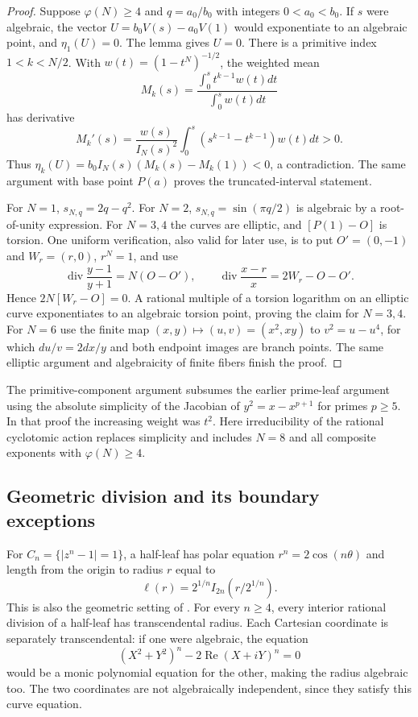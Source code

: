 \documentclass[11pt,a4paper]{article}
\theoremstyle{definition}
\theoremstyle{remark}
\numberwithin{equation}{section}
\begin{document}
\begin{proof}
Suppose $\varphi(N)\ge4$ and $q=a_0/b_0$ with integers
$0<a_0<b_0$.  If $s$ were algebraic, the vector
$U=b_0V(s)-a_0V(1)$ would exponentiate to an algebraic point, and
$\eta_1(U)=0$.  The lemma gives $U=0$.
There is a primitive index $1<k<N/2$.  With
$w(t)=(1-t^N)^{-1/2}$, the weighted mean
\[
M_k(s)=\frac{\int_0^s t^{k-1}w(t)dt}{\int_0^s w(t)dt}
\]
has derivative
\[
M_k'(s)=\frac{w(s)}{I_N(s)^2}
\int_0^s(s^{k-1}-t^{k-1})w(t)dt>0.
\]
Thus $\eta_k(U)=b_0I_N(s)(M_k(s)-M_k(1))<0$, a contradiction.
The same argument with base point $P(a)$ proves the truncated-interval
statement.

For $N=1$, $s_{N,q}=2q-q^2$.  For $N=2$,
$s_{N,q}=\sin(\pi q/2)$ is algebraic by a root-of-unity expression.
For $N=3,4$ the curves are elliptic, and $[P(1)-O]$ is torsion.
One uniform verification, also valid for later use, is to put
$O'=(0,-1)$ and $W_r=(r,0)$, $r^N=1$, and use
\begin{equation}\label{beta-eq-endpoint-divisors}
\operatorname{div}\frac{y-1}{y+1}=N(O-O'),\qquad
\operatorname{div}\frac{x-r}{x}=2W_r-O-O'.
\end{equation}
Hence $2N[W_r-O]=0$.  A rational multiple of a torsion logarithm on an
elliptic curve exponentiates to an algebraic torsion point, proving the
claim for $N=3,4$.  For $N=6$ use the finite map
$(x,y)\mapsto(u,v)=(x^2,xy)$ to $v^2=u-u^4$, for which
$du/v=2dx/y$ and both endpoint images are branch points.  The same
elliptic argument and algebraicity of finite fibers finish the proof.
\end{proof}

The primitive-component argument subsumes the earlier prime-leaf
argument using the absolute simplicity of the Jacobian of
$y^2=x-x^{p+1}$ for primes $p\ge5$.  In that proof the increasing
weight was $t^2$.  Here irreducibility of the rational cyclotomic action
replaces simplicity and includes $N=8$ and all composite exponents with
$\varphi(N)\ge4$.

\subsection{Geometric division and its boundary exceptions}

For $C_n=\{|z^n-1|=1\}$, a half-leaf has polar equation
$r^n=2\cos(n\theta)$ and length from the origin to radius $r$ equal to
\begin{equation}\label{beta-eq-leaf-length}
\ell(r)=2^{1/n}I_{2n}(r/2^{1/n}).
\end{equation}
This is also the geometric setting of \cite[Section~3.4 and
Remark~5.7]{beta-tamiozzo}.  For every $n\ge4$, every interior rational
division of a half-leaf has transcendental radius.  Each Cartesian
coordinate is separately transcendental: if one were algebraic, the
equation
\[
(X^2+Y^2)^n-2\operatorname{Re}(X+iY)^n=0
\]
would be a monic polynomial equation for the other, making the radius
algebraic too.  The two coordinates are not algebraically independent,
since they satisfy this curve equation.
\end{document}
